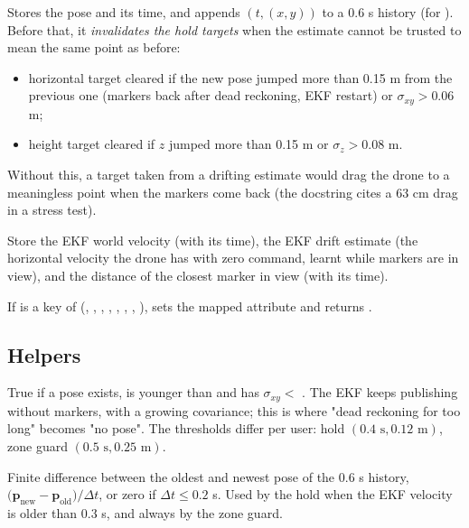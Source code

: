 Stores the pose and its time, and appends $(t,(x,y))$ to a 0.6 s history (for ). Before that,
it \emph{invalidates the hold targets} when the estimate cannot be trusted to mean the same point as before:
\begin{itemize}[itemsep=1pt]
\item horizontal target cleared if the new pose jumped more than 0.15 m from the previous one (markers back after
dead reckoning, EKF restart) or $\sigma_{xy}>0.06$ m;
\item height target cleared if $z$ jumped more than 0.15 m or $\sigma_z>0.08$ m.
\end{itemize}
Without this, a target taken from a drifting estimate would drag the drone to a meaningless point when the
markers come back (the docstring cites a 63 cm drag in a stress test).

Store the EKF world velocity (with its time), the EKF drift estimate (the horizontal velocity the drone has with
zero command, learnt while markers are in view), and the distance of the closest marker in view (with its time).

If  is a key of  (, , ,
, , , , ), sets the
mapped attribute and returns .

\subsection{Helpers}

True if a pose exists, is younger than  and has $\sigma_{xy}<$ . The EKF keeps
publishing without markers, with a growing covariance; this is where "dead reckoning for too long" becomes "no
pose". The thresholds differ per user: hold $(0.4\text{ s}, 0.12\text{ m})$, zone guard $(0.5\text{ s},
0.25\text{ m})$.

Finite difference between the oldest and newest pose of the 0.6 s history, $\big(\bm p_{\text{new}}-\bm
p_{\text{old}}\big)/\Delta t$, or zero if $\Delta t\le0.2$ s. Used by the hold when the EKF velocity is older than
0.3 s, and always by the zone guard.

